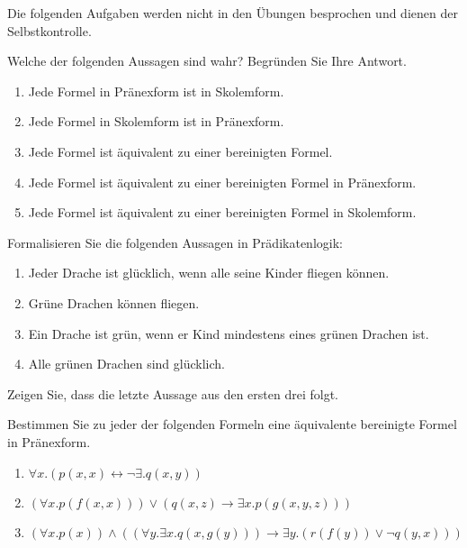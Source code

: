 \documentclass[german]{latteachCD}[2017/03/28]
\begin{document}
\maketitle

\begin{mdframed}
  Die folgenden Aufgaben werden nicht in den Übungen besprochen und dienen der
  Selbstkontrolle.

  \renewcommand{\theexercise}{\Roman{exercise}}
  \setcounter{exercise}{0}

  \begin{exercise}
    Welche der folgenden Aussagen sind wahr?  Begründen Sie Ihre Antwort.
    \begin{enumerate}
    \item Jede Formel in Pränexform ist in Skolemform.
    \item Jede Formel in Skolemform ist in Pränexform.
    \item Jede Formel ist äquivalent zu einer bereinigten Formel.
    \item Jede Formel ist äquivalent zu einer bereinigten Formel in Pränexform.
    \item Jede Formel ist äquivalent zu einer bereinigten Formel in Skolemform.
    \end{enumerate}
  \end{exercise}

  \begin{exercise}
    Formalisieren Sie die folgenden Aussagen in Prädikatenlogik:
    \begin{enumerate}
    \item Jeder Drache ist glücklich, wenn alle seine Kinder fliegen können.
    \item Grüne Drachen können fliegen.
    \item Ein Drache ist grün, wenn er Kind mindestens eines grünen Drachen ist.
    \item Alle grünen Drachen sind glücklich.
    \end{enumerate}
    Zeigen Sie, dass die letzte Aussage aus den ersten drei folgt.
  \end{exercise}
\end{mdframed}

\setcounter{exercise}{0}

\vspace*{\baselineskip}


\begin{exercise}
  Bestimmen Sie zu jeder der folgenden Formeln eine äquivalente bereinigte
  Formel in Pränexform.
  \begin{enumerate}
  \item $\forall x.(p(x,x) \leftrightarrow \lnot \exists.q(x,y))$
  \item $(\forall x.p(f(x,x))) \lor (q(x,z) \to \exists x.p(g(x,y,z)))$
  \item $(\forall x.p(x)) \land ((\forall y.\exists x.q(x,g(y))) \to \exists
    y.(r(f(y)) \lor \lnot q(y,x)))$
  \end{enumerate}
\end{exercise}
\end{document}
